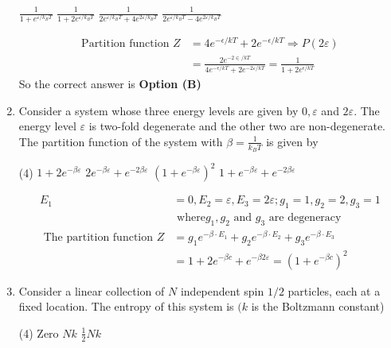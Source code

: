 \begin{enumerate}
\begin{tasks}
\task[\textbf{A.}] $\frac{1}{1+e^{\varepsilon / k_{B} T}}$
\task[\textbf{B.}] $\frac{1}{1+2 e^{\varepsilon / k_{B} T}}$
\task[\textbf{C.}] $\frac{1}{2 e^{\varepsilon / k_{B} T}+4 e^{2 \varepsilon / k_{B} T}}$
\task[\textbf{D.}] $\frac{1}{2 e^{\varepsilon / k_{B} T}-4 e^{2 \varepsilon / k_{B} T}}$
\end{tasks}
\begin{answer}
\begin{align*}
\text{Partition function }Z&=4 e^{-\epsilon / k T}+2 e^{-\epsilon / k T} \Rightarrow P(2 \varepsilon)\\&=\frac{2 e^{-2 \in / k T}}{4 e^{-\epsilon / k T}+2 e^{-2 \varepsilon / k T}}=\frac{1}{1+2 e^{\epsilon / k T}}
\end{align*}
So the correct answer is \textbf{Option (B)}
\end{answer}	
\item Consider a system whose three energy levels are given by $0, \varepsilon$ and $2 \varepsilon$. The energy level $\varepsilon$ is two-fold degenerate and the other two are non-degenerate. The partition function of the system with $\beta=\frac{1}{k_{B} T}$ is given by
{}
\begin{tasks}(4)
\task[\textbf{A.}] $1+2 e^{-\beta \varepsilon}$
\task[\textbf{B.}] $2 e^{-\beta \varepsilon}+e^{-2 \beta \varepsilon}$
\task[\textbf{C.}] $\left(1+e^{-\beta \varepsilon}\right)^{2}$
\task[\textbf{D.}] $1+e^{-\beta \varepsilon}+e^{-2 \beta \varepsilon}$
\end{tasks}
\begin{answer}
\begin{align*}
E_{1}&=0, E_{2}=\varepsilon, E_{3}=2 \varepsilon ; g_{1}=1, g_{2}=2, g_{3}=1\\&\text{ where} g_{1}, g_{2}\text{ and }g_{3}\text{ are degeneracy}\\
\text{	The partition function }Z&=g_{1} e^{-\beta \cdot E_{1}}+g_{2} e^{-\beta \cdot E_{2}}+g_{3} e^{-\beta \cdot E_{3}}\\&=1+2 e^{-\beta c}+e^{-\beta 2 \varepsilon}=\left(1+e^{-\beta c}\right)^{2}
\end{align*}
\end{answer}	
\item Consider a linear collection of $N$ independent spin $1 / 2$ particles, each at a fixed location. The entropy of this system is $(k$ is the Boltzmann constant)
{}
\begin{tasks}(4)
\task[\textbf{A.}] Zero
\task[\textbf{B.}]  $N k$
\task[\textbf{C.}]  $\frac{1}{2} N k$

\end{tasks}
\end{enumerate}
